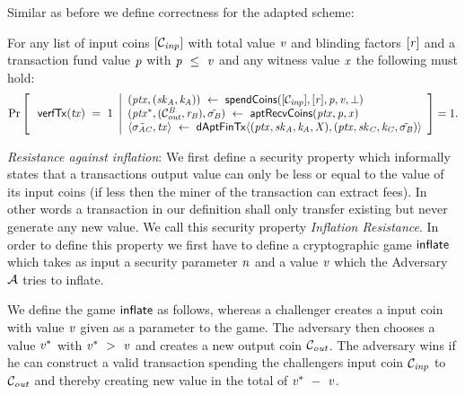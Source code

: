 Similar as before we define correctness for the adapted scheme:

\begin{definition}
    \label{def:atom:apt-tx-scheme-correctness}
    For any list of input coins $[\mathcal{C}_{\mathit{inp}}]$ with total value $\mathit{v}$ and blinding factors
    $[\mathit{r}]$ and a transaction fund value $\mathit{p}$ with $\mathit{p} ~\leq~ \mathit{v}$ and any witness value $\mathit{x}$ the following must hold:
    \[
        \Pr\left[
        \begin{array}{c}
            \: \mathsf{verfTx}(\mathit{tx}) ~=~ 1
        \end{array}
        \middle\vert
        \begin{array}{l}
            (\mathit{ptx}, (\mathit{sk}_{\mathit{A}}, \mathit{\mathit{k}_{\mathit{A}}})) ~\leftarrow~ \mathsf{spendCoins}([\mathcal{C}_{\mathit{inp}}],[\mathit{r}],\mathit{p},\mathit{v},\bot) \\
            (\mathit{ptx}^*, (\mathcal{C}_{\mathit{out}}^{\mathit{B}},\mathit{r}_{\mathit{B}}), \tilde{\sigma_{\mathit{B}}}) ~\leftarrow~ \mathsf{aptRecvCoins}(\mathit{ptx},\mathit{p},\mathit{x}) \\
            \langle \tilde{\sigma_{\mathit{A}\mathit{C}}}, \mathit{tx} \rangle ~\leftarrow~ \mathsf{dAptFinTx} \langle (\mathit{ptx},\mathit{sk}_{\mathit{A}},\mathit{\mathit{k}_{\mathit{A}}},\mathit{X}), (\mathit{ptx},\mathit{sk}_{\mathit{C}},\mathit{\mathit{k}_{\mathit{C}}},\tilde{\sigma_{\mathit{B}}}) \rangle
        \end{array}
        \right]=1.
    \]
\end{definition}

\emph{Resistance against inflation}: We first define a security property which informally states that a transactions output value can only be less or equal to the value of its input coins (if less then the miner of the transaction can extract fees).
In other words a transaction in our definition shall only transfer existing but never generate any new value. We call this security property \emph{Inflation Resistance}.
In order to define this property we first have to define a cryptographic game $\mathsf{inflate}$ which takes as input a security parameter $\mathit{n}$ and a value $\mathit{v}$ which the Adversary
$\mathcal{A}$ tries to inflate.

We define the game $\mathsf{inflate}$ as follows, whereas a challenger creates a input coin with value $\mathit{v}$ given as a parameter to the game. The adversary then chooses a value $\mathit{v}^*$ with
$\mathit{v}^* ~>~ \mathit{v}$ and creates a new output coin $\mathcal{C}_{\mathit{out}}$. The adversary wins if he can construct a valid transaction spending the challengers input coin $\mathcal{C}_{\mathit{inp}}$ to $\mathcal{C}_{\mathit{out}}$ and thereby
creating new value in the total of $\mathit{v}^* ~-~ \mathit{v}$.

